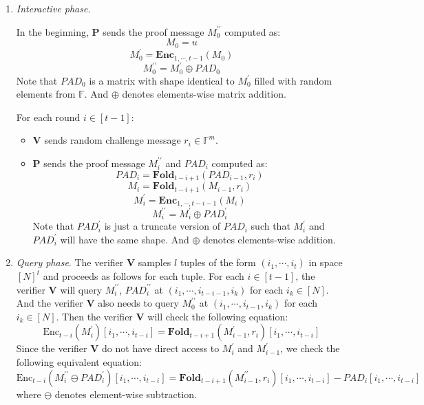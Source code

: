 \begin{enumerate}
    \item \textit{Interactive phase}. 
    
    In the beginning, $\textbf{P}$ sends the proof message $M_0^{\prime\prime}$ computed as:
$$
    M_0 = u
$$
$$
    M_0^{\prime} = \textbf{Enc}_{1,\cdots,t-1}(M_0)
$$
$$
    M_0^{\prime\prime} = M_0^{\prime} \oplus PAD_0
$$
    Note that $PAD_0$ is a matrix with shape identical to $M_0^\prime$ filled with random elements from $\mathbb{F}$. And $\oplus$ denotes elements-wise matrix addition.
    
    For each round $i \in [t-1]$:
    \begin{itemize}
        \item $\textbf{V}$ sends random challenge message $r_i \in \mathbb{F}^m$.
        \item $\textbf{P}$ sends the proof message $M_i^{\prime\prime}$ and $PAD_i$ computed as:
$$
    PAD_i = \textbf{Fold}_{t-i+1}(PAD_{i-1}, r_i)
$$
$$
    M_i = \textbf{Fold}_{t-i+1}(M_{i-1}, r_i)
$$
$$
    M_i^\prime =  \textbf{Enc}_{1, \cdots, t- i - 1}(M_i)
$$
$$
    M_i^{\prime\prime} = M_i^{\prime} \oplus PAD_i^\prime
$$
    Note that $PAD_i^\prime$ is just a truncate version of $PAD_i$ such that $M_i^{\prime}$ and $ PAD_i^\prime$ will have the same shape. And $\oplus$ denotes elements-wise addition.

    \end{itemize}
    \item \textit{Query phase}. The verifier $\textbf{V}$ samples $l$ tuples of the form $(i_1, \cdots, i_t)$ in space $[N]^t$ and proceeds as follows for each tuple. For each $i \in [t-1]$, the verifier $\textbf{V}$ will query $M_{i}^{\prime\prime}$, $PAD_{i}^{\prime\prime}$ at $(i_1, \cdots, i_{t-i-1}, i_k)$ for each $i_k \in [N]$. And the verifier $\textbf{V}$ also needs to query $M_{0}^{\prime\prime}$ at $(i_1, \cdots, i_{t-1}, i_k)$ for each $i_k \in [N]$. Then the verifier $\textbf{V}$ will check the following equation:
$$
    \text{Enc}_{t-i}(M_i^\prime)[i_1, \cdots, i_{t-i}] = \textbf{Fold}_{t-i+1}(M_{i-1}^\prime, r_i) [i_1, \cdots, i_{t-i}]
$$
Since the verifier $\textbf{V}$ do not have direct access to $M_i^\prime$ and $M_{i-1}^\prime$, we check the following equivalent equation:
\begin{equation}
\label{eq:szkpctc_eq}
    \text{Enc}_{t-i}(M_i^{\prime\prime} \ominus PAD_{i}^\prime)[i_1, \cdots, i_{t-i}] = \textbf{Fold}_{t-i+1}(M_{i-1}^{\prime\prime}, r_i) [i_1, \cdots, i_{t-i}] - PAD_i[i_1, \cdots, i_{t-i}]
\end{equation}
where $\ominus$ denotes element-wise subtraction.
\end{enumerate}

